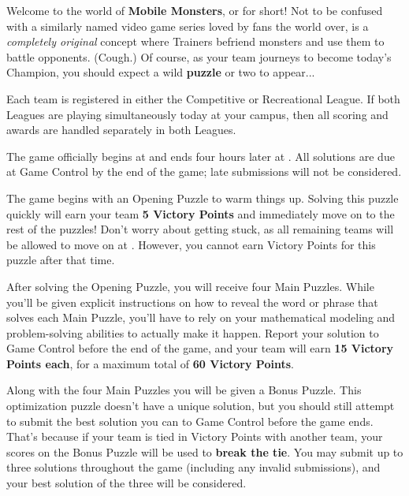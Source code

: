 
Welcome to the world of \textbf{Mobile Monsters}, or \mappMobimon{} for short!
Not to be confused with a similarly named video game series loved
by fans the world over, \mappMobimon{} is a \textit{completely original} concept
where Trainers befriend monsters and use them to battle opponents.
(Cough.) Of course,
as your team journeys to become today's \mappMobimon{} Champion,
you should expect a wild \textbf{puzzle} or two to appear...


Each team is registered in either the Competitive or Recreational League.
If both Leagues are playing simultaneously today at your campus, then all
scoring and awards are handled separately in both Leagues.


The game officially begins at \underline{\hspace{5em}} and ends
four hours later at \underline{\hspace{5em}}. All solutions are due at
Game Control by the end of the game; late submissions will not be considered.


The game begins with an Opening Puzzle to warm things up. Solving this
puzzle quickly will earn your team \textbf{5 Victory Points} and
immediately move on to the rest of the puzzles!
Don't worry about getting stuck, as all remaining
teams will be allowed to move on
at \underline{\hspace{5em}}. However, you cannot earn Victory Points for
this puzzle after that time.


After solving the Opening Puzzle, you will receive four
Main Puzzles. While you'll be given explicit instructions on how to
reveal the word or phrase that solves each Main Puzzle, you'll have to
rely on your mathematical modeling and problem-solving abilities to actually
make it happen. Report your solution to Game Control before the end of
the game, and your team will earn \textbf{15 Victory Points each},
for a maximum total of \textbf{60 Victory Points}.

\newpage


Along with the four Main Puzzles you will be given a Bonus Puzzle. This
optimization puzzle doesn't have a unique solution, but you should still
attempt to submit the best solution you can to Game Control before the
game ends. That's because if your team is tied in
Victory Points with another team, your scores on the Bonus Puzzle will be used
to \textbf{break the tie}. You may submit up to three solutions throughout
the game (including any invalid submissions), and your best solution of the
three will be considered.

